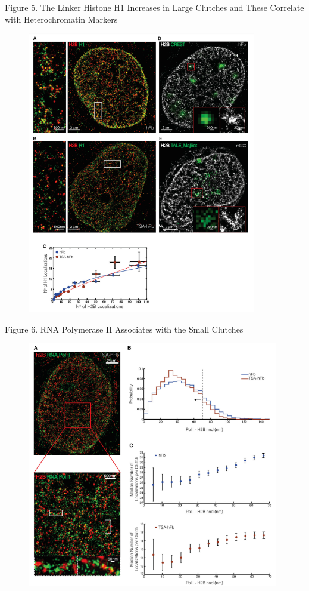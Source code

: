 \documentclass{beamer}			%
\begin{document}
\begin{frame}{Figure 5. The Linker Histone H1 Increases in Large Clutches and These Correlate with Heterochromatin Markers}
\begin{figure}
\includegraphics[width=10cm]{Figure-5.png}
\end{figure}
\end{frame}

\begin{frame}{Figure 6. RNA Polymerase II Associates with the Small Clutches}
\begin{figure}
\includegraphics[width=11cm]{Figure-6.png}
\end{figure}
\end{frame}
\end{document}
